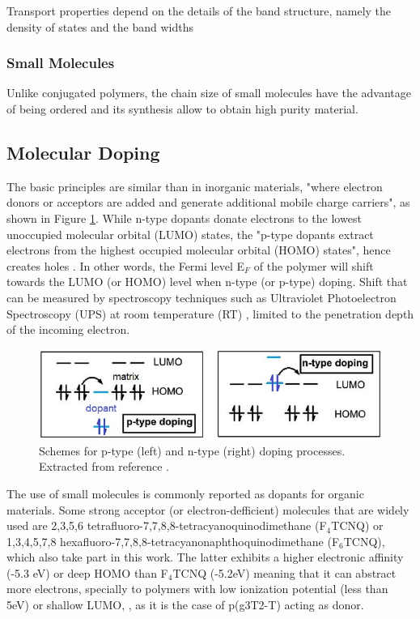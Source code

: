 Transport properties depend on the details of the band structure, namely the density of states and the band widths

\subsubsection{Small Molecules}
Unlike conjugated polymers, the chain size of small molecules have the advantage of being ordered and its synthesis allow to obtain high purity material.

\subsection{Molecular Doping}
The basic principles are similar than in inorganic materials, "where electron donors or acceptors are added and generate additional mobile charge carriers", as shown in Figure \ref{fig:doping}. While n-type dopants donate electrons to the lowest unoccupied molecular orbital (LUMO) states, the "p-type dopants extract electrons from the highest occupied molecular orbital (HOMO) states", hence creates holes \cite{lussemDopingOrganicSemiconductors2013}. In other words, the Fermi level E$_{F}$ of the polymer will shift towards the LUMO (or HOMO) level when n-type (or p-type) doping. Shift that can be measured by spectroscopy techniques such as Ultraviolet Photoelectron Spectroscopy (UPS) at room temperature (RT) \cite{tietzeFermiLevelShift2012}, limited to the penetration depth of the incoming electron.

\begin{figure}
  \centering
  \includegraphics[width=12cm]{Images/doping.jpg}
  \caption{Schemes for p-type (left) and n-type (right) doping processes. Extracted from reference \cite{lussemDopingOrganicSemiconductors2013}.}
  \label{fig:doping}
\end{figure}

The use of small molecules is commonly reported as dopants for organic materials. Some strong acceptor (or electron-defficient) molecules that are widely used are 2,3,5,6 tetrafluoro-7,7,8,8-tetracyanoquinodimethane (F$_{4}$TCNQ) or 1,3,4,5,7,8 hexafluoro-7,7,8,8-tetracyanonaphthoquinodimethane (F$_{6}$TCNQ), which also take part in this work. The latter exhibits a higher electronic affinity (-5.3 eV) or deep HOMO than F$_{4}$TCNQ (-5.2eV) meaning that it can abstract more electrons, specially to polymers with low ionization potential (less than 5eV) or shallow LUMO, \cite{kieferDoubleDopingConjugated2019}, as it is the case of p(g3T2-T) acting as donor.

